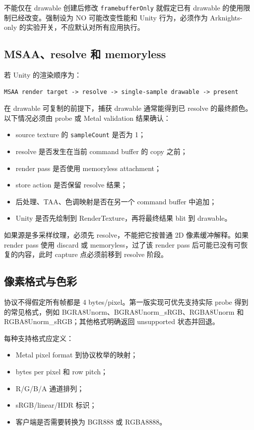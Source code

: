 \documentclass[UTF8,a4paper,11pt]{ctexart}
\begin{document}
不能仅在 drawable 创建后修改 \texttt{framebufferOnly} 就假定已有 drawable 的使用限制已经改变。强制设为 NO 可能改变性能和 Unity 行为，必须作为 Arknights-only 的实验开关，不应默认对所有应用执行。

\subsection{MSAA、resolve 和 memoryless}

若 Unity 的渲染顺序为：

\begin{lstlisting}
MSAA render target -> resolve -> single-sample drawable -> present
\end{lstlisting}

在 drawable 可复制的前提下，捕获 drawable 通常能得到已 resolve 的最终颜色。以下情况必须由 probe 或 Metal validation 结果确认：

\begin{itemize}
  \item source texture 的 \texttt{sampleCount} 是否为 1；
  \item resolve 是否发生在当前 command buffer 的 copy 之前；
  \item render pass 是否使用 memoryless attachment；
  \item store action 是否保留 resolve 结果；
  \item 后处理、TAA、色调映射是否在另一个 command buffer 中追加；
  \item Unity 是否先绘制到 RenderTexture，再将最终结果 blit 到 drawable。
\end{itemize}

如果源是多采样纹理，必须先 resolve，不能把它按普通 2D 像素缓冲解释。如果 render pass 使用 discard 或 memoryless，过了该 render pass 后可能已没有可恢复的内容，此时 capture 点必须前移到 resolve 阶段。

\subsection{像素格式与色彩}

协议不得假定所有帧都是 4 bytes/pixel。第一版实现可优先支持实际 probe 得到的常见格式，例如 BGRA8Unorm、BGRA8Unorm\_sRGB、RGBA8Unorm 和 RGBA8Unorm\_sRGB；其他格式明确返回 unsupported 状态并回退。

每种支持格式应定义：

\begin{itemize}
  \item Metal pixel format 到协议枚举的映射；
  \item bytes per pixel 和 row pitch；
  \item R/G/B/A 通道排列；
  \item sRGB/linear/HDR 标识；
  \item 客户端是否需要转换为 BGR888 或 RGBA8888。
\end{itemize}
\end{document}
